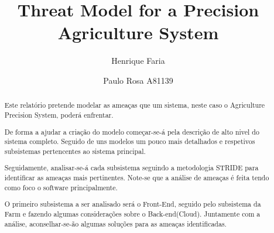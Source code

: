 

\title{Threat Model for a Precision Agriculture System}

\author{Henrique Faria \and Paulo Rosa A81139}




\maketitle

\begin{abstract}

\par\hfill
\par Este relatório pretende modelar as ameaças que um sistema, neste caso o Agriculture Precision System, poderá enfrentar. 
\par De forma a ajudar a criação do modelo começar-se-á pela descrição de alto nivel do sistema completo. Seguido de uns modelos um pouco mais detalhados e respetivos subsistemas pertencentes ao sistema principal.
\par Seguidamente, analisar-se-á cada subsistema seguindo a metodologia STRIDE para identificar as ameaças mais pertinentes. Note-se que a análise de ameaças é feita tendo como foco o software principalmente.
\par O primeiro subsistema a ser analisado será o Front-End, seguido pelo subsistema da Farm e fazendo algumas considerações sobre o Back-end(Cloud). 
Juntamente com a análise, aconselhar-se-ão algumas soluções para as ameaças identificadas.

\end{abstract}

